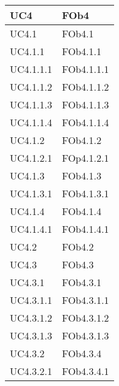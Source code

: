 \begin{longtable}{|l|p{4cm}|}
\hline
		UC4 & FOb4 \linebreak   \\
\hline
		UC4.1 & FOb4.1 \linebreak   \\
\hline
		UC4.1.1 & FOb4.1.1 \linebreak   \\
\hline
		UC4.1.1.1 & FOb4.1.1.1 \linebreak   \\
\hline
		UC4.1.1.2 & FOb4.1.1.2 \linebreak   \\
\hline
		UC4.1.1.3 & FOb4.1.1.3 \linebreak   \\
\hline
		UC4.1.1.4 & FOb4.1.1.4 \linebreak   \\
\hline
		UC4.1.2 & FOb4.1.2 \linebreak   \\
\hline
		UC4.1.2.1 & FOp4.1.2.1 \linebreak   \\
\hline
		UC4.1.3 & FOb4.1.3 \linebreak   \\
\hline
		UC4.1.3.1 & FOb4.1.3.1 \linebreak   \\
\hline
		UC4.1.4 & FOb4.1.4 \linebreak   \\
\hline
		UC4.1.4.1 & FOb4.1.4.1 \linebreak   \\
\hline
		UC4.2 & FOb4.2 \linebreak   \\
\hline
		UC4.3 & FOb4.3 \linebreak   \\
\hline
		UC4.3.1 & FOb4.3.1 \linebreak   \\
\hline
		UC4.3.1.1 & FOb4.3.1.1 \linebreak   \\
\hline
		UC4.3.1.2 & FOb4.3.1.2 \linebreak   \\
\hline
		UC4.3.1.3 & FOb4.3.1.3 \linebreak   \\
\hline
		UC4.3.2 & FOb4.3.4 \linebreak   \\
\hline
		UC4.3.2.1 & FOb4.3.4.1 \linebreak   \\

\end{longtable}
